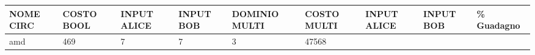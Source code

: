 \documentclass[
]{book}
\begin{document}
\begin{longtable}[]{@{}lllllllll@{}}
\toprule
\begin{minipage}[b]{0.07\columnwidth}\raggedright
NOME CIRC\strut
\end{minipage} & \begin{minipage}[b]{0.11\columnwidth}\raggedright
COSTO BOOL\strut
\end{minipage} & \begin{minipage}[b]{0.08\columnwidth}\raggedright
INPUT ALICE\strut
\end{minipage} & \begin{minipage}[b]{0.07\columnwidth}\raggedright
INPUT BOB\strut
\end{minipage} & \begin{minipage}[b]{0.09\columnwidth}\raggedright
DOMINIO MULTI\strut
\end{minipage} & \begin{minipage}[b]{0.12\columnwidth}\raggedright
COSTO MULTI\strut
\end{minipage} & \begin{minipage}[b]{0.08\columnwidth}\raggedright
INPUT ALICE\strut
\end{minipage} & \begin{minipage}[b]{0.07\columnwidth}\raggedright
INPUT BOB\strut
\end{minipage} & \begin{minipage}[b]{0.07\columnwidth}\raggedright
\% Guadagno\strut
\end{minipage}\tabularnewline
\midrule
\endhead
\begin{minipage}[t]{0.07\columnwidth}\raggedright
amd\strut
\end{minipage} & \begin{minipage}[t]{0.11\columnwidth}\raggedright
469\strut
\end{minipage} & \begin{minipage}[t]{0.08\columnwidth}\raggedright
7\strut
\end{minipage} & \begin{minipage}[t]{0.07\columnwidth}\raggedright
7\strut
\end{minipage} & \begin{minipage}[t]{0.09\columnwidth}\raggedright
3\strut
\end{minipage} & \begin{minipage}[t]{0.12\columnwidth}\raggedright
47568\strut
\end{minipage} & \begin{minipage}[t]{0.08\columnwidth}\raggedright

\end{minipage}
\end{longtable}
\end{document}
